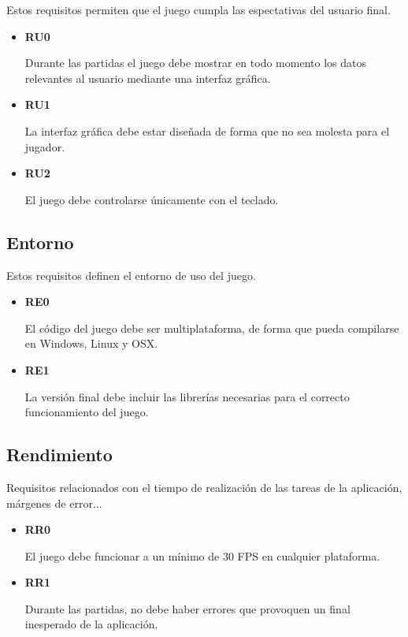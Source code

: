 		Estos requisitos permiten que el juego cumpla las espectativas del usuario final.

		\begin{itemize}
				\item \textbf{RU0}
					
				Durante las partidas el juego debe mostrar en todo momento los datos relevantes al usuario mediante una interfaz gráfica.

				\item \textbf{RU1}
					
				La interfaz gráfica debe estar diseñada de forma que no sea molesta para el jugador.

				\item \textbf{RU2}
					
				El juego debe controlarse únicamente con el teclado.
		\end{itemize}

	\subsection{Entorno}

		Estos requisitos definen el entorno de uso del juego.

		\begin{itemize}
				\item \textbf{RE0}
					
				El código del juego debe ser multiplataforma, de forma que pueda compilarse en Windows, Linux y OSX.

				\item \textbf{RE1}
					
				La versión final debe incluir las librerías necesarias para el correcto funcionamiento del juego.
		\end{itemize}

	\subsection{Rendimiento}

		Requisitos relacionados con el tiempo de realización de las tareas de la aplicación, márgenes de error...

		\begin{itemize}
				\item \textbf{RR0}
					
				El juego debe funcionar a un mínimo de 30 FPS en cualquier plataforma.

				\item \textbf{RR1}
					
				Durante las partidas, no debe haber errores que provoquen un final inesperado de la aplicación.
		\end{itemize}

